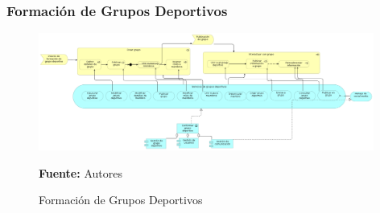 \subsubsection{Formación de Grupos Deportivos}

\begin{figure}[!htb]
  \begin{center}
    \includegraphics[width=11cm]{./imagenes/application_usage/formaciongruposdeportivos.png}
    \caption{Formación de Grupos Deportivos}
    \label{fig:au_formacion_grupos_deportivos}
    \textbf{Fuente:}  Autores
  \end{center}
\end{figure}

